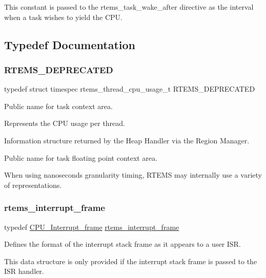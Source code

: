 This constant is passed to the rtems\+\_\+task\+\_\+wake\+\_\+after directive as the interval when a task wishes to yield the C\+PU. 

\subsection{Typedef Documentation}
\mbox{\label{group__ClassicTasks_ga6e7bd1624f0779bd750f1726e15cb910}} 
\subsubsection{\texorpdfstring{RTEMS\_DEPRECATED}{RTEMS\_DEPRECATED}}
{\footnotesize\ttfamily typedef struct timespec rtems\+\_\+thread\+\_\+cpu\+\_\+usage\+\_\+t R\+T\+E\+M\+S\+\_\+\+D\+E\+P\+R\+E\+C\+A\+T\+ED}



Public name for task context area. 

Represents the C\+PU usage per thread.

Information structure returned by the Heap Handler via the Region Manager.

Public name for task floating point context area.

When using nanoseconds granularity timing, R\+T\+E\+MS may internally use a variety of representations. \mbox{\label{group__ClassicTasks_ga6374920e14baf6b41535ae52b06e6e1c}} 
\subsubsection{\texorpdfstring{rtems\_interrupt\_frame}{rtems\_interrupt\_frame}}
{\footnotesize\ttfamily typedef \mbox{\hyperlink{structCPU__Interrupt__frame}{C\+P\+U\+\_\+\+Interrupt\+\_\+frame}} \mbox{\hyperlink{group__ClassicTasks_ga6374920e14baf6b41535ae52b06e6e1c}{rtems\+\_\+interrupt\+\_\+frame}}}



Defines the format of the interrupt stack frame as it appears to a user I\+SR. 

This data structure is only provided if the interrupt stack frame is passed to the I\+SR handler.

